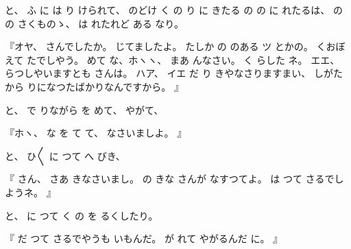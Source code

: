 と、
%
ふ
に
は
り
けられて、
%
のどけ
く
の
り
に
きたる
の
の
に
れたるは、
%
の
の
さくものゝ、
%
は
れたれど
ある%
なり。

『オヤ、
%
さんでしたか。
%
じてましたよ。
%
たしか
の
のある
ツ
とかの。
%
くおぼえて
たでしやう。
%
めて
な、ホヽヽ、
%
まあ
んなさい。
%
く
らした
ネ。
%
エエ、
%
らつしやいますとも
さんは。
%
ハア、
%
イエ
だ
り
きやなさりますまい、
%
しがた
から
りになつたばかりなんですから。
』

と、
%
で
りながら
を
めて、
%
やがて、

『ホヽ、
%
な
を
て
て、
%
なさいましよ。
』

と、
%
ひ〳〵
に
つて
へ
びき、

『
さん、
%
さあ
きなさいまし。
%
の
きな
さんが
なすつてよ。
%
は
つて
さるでしようネ。
』

と、
%
に
つて
く
の
を
るくしたり。

『
だ
つて
さるでやうも
いもんだ。
%
が
れて
やがるんだ
に。
』

